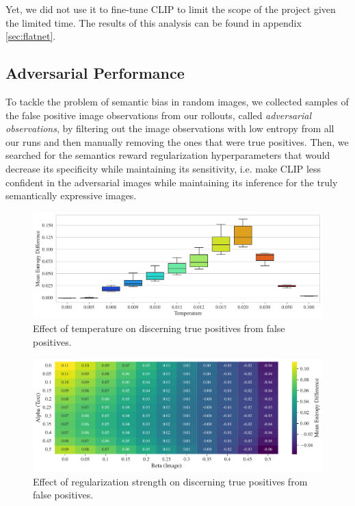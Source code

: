 Yet, we did not use it to fine-tune CLIP to limit the scope of the project given the limited time.
The results of this analysis can be found in appendix \ref{sec:flatnet}.

\subsection{Adversarial Performance}
\label{sec:adversarial-performance}
To tackle the problem of semantic bias in random images, we collected samples of the false positive image observations from our rollouts, called \emph{adversarial observations}, by filtering out the image observations with low entropy from all our runs and then manually removing the ones that were true positives.
Then, we searched for the semantics reward regularization hyperparameters that would decrease its specificity while maintaining its sensitivity, i.e. make CLIP less confident in the adversarial images while maintaining its inference for the truly semantically expressive images.

\begin{figure}[H]
    \centering
    \includegraphics[width=\textwidth]{images/temperature_adversarial.pdf}
    \caption{Effect of temperature on discerning true positives from false positives.}
    \label{fig:clip-temperature-adversarial}
\end{figure}

\begin{figure}[H]
    \centering
    \includegraphics[width=\textwidth]{images/alpha_beta_adversarial.pdf}
    \caption{Effect of regularization strength on discerning true positives from false positives.}
    \label{fig:clip-alpha-beta-adversarial}
\end{figure}

